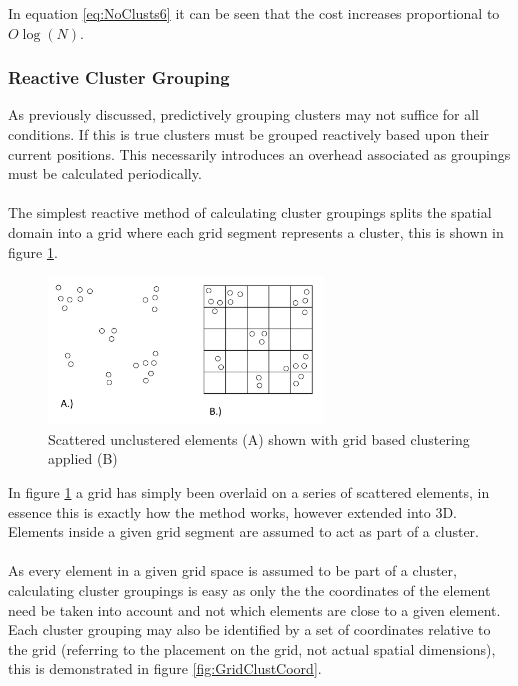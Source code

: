 In equation \ref{eq:NoClusts6} it can be seen that  the cost increases proportional to $O\log(N)$.

\subsubsection{Reactive Cluster Grouping}
As previously discussed, predictively grouping clusters may not suffice for all conditions. If this is true clusters must be grouped reactively based upon their current positions. This necessarily introduces an overhead associated as groupings must be calculated periodically.
\\\\
The simplest reactive method of calculating cluster groupings splits the spatial domain into a grid where each grid segment represents a cluster, this is shown in figure \ref{fig:GridClust}.

\begin{figure}[H]
\centering
\includegraphics[width=0.65\textwidth]{Figures/Grid_Cluster.png}
\caption{\label{fig:GridClust} Scattered unclustered elements (A) shown with grid based clustering applied (B)}
\end{figure}

In figure \ref{fig:GridClust} a grid has simply been overlaid on a series of scattered elements, in essence this is exactly how the method works, however extended into 3D. Elements inside a given grid segment are assumed to act as part of a cluster.
\\\\
As every element in a given grid space is assumed to be part of a cluster, calculating cluster groupings is easy as only the the coordinates of the element need be taken into account and not which elements are close to a given element. Each cluster grouping may also be identified by a set of coordinates relative to the grid (referring to the placement on the grid, not actual spatial dimensions), this is demonstrated in figure \ref{fig:GridClustCoord}.

